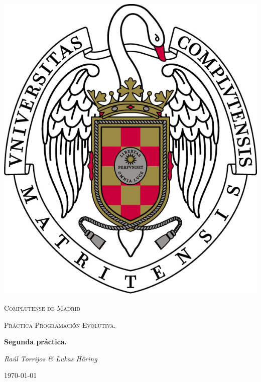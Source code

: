 \documentclass{article}
\begin{document}
\usetikzlibrary{automata,arrows, positioning}
\renewcommand{\contentsname}{Tabla de contenidos}

\begin{titlepage}
	\begin{center}
		\includegraphics{./images/escudo.jpg}
	\end{center}
	\centering
	{\scshape\LARGE Complutense de Madrid \par}
	\vspace{1cm}
	{\scshape\Large Práctica Programación Evolutiva.\par}
	\vspace{1.5cm}
	{\huge\bfseries Segunda práctica. \par}
	\vspace{2cm}
	{\Large\itshape Raúl Torrijos \& Lukas Häring\par}
	\vfill
	\vfill

	{\large \today\par}
\end{titlepage}

\tableofcontents
\end{document}
